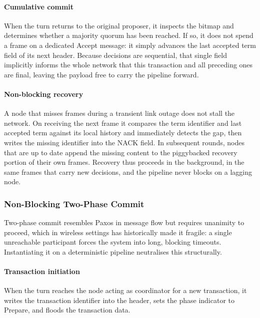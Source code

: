 \documentclass[journal]{IEEEtran}
\begin{document}
\paragraph{Cumulative commit}
When the turn returns to the original proposer, it inspects the bitmap and
determines whether a majority quorum has been reached. If so, it does not
spend a frame on a dedicated Accept message: it simply advances the last
accepted term field of its next header. Because decisions are sequential,
that single field implicitly informs the whole network that this
transaction and all preceding ones are final, leaving the payload free to
carry the pipeline forward.

\paragraph{Non-blocking recovery}
A node that misses frames during a transient link outage does not stall
the network. On receiving the next frame it compares the term identifier
and last accepted term against its local history and immediately detects
the gap, then writes the missing identifier into the NACK field. In
subsequent rounds, nodes that are up to date append the missing content to
the piggybacked recovery portion of their own frames. Recovery thus
proceeds in the background, in the same frames that carry new decisions,
and the pipeline never blocks on a lagging node.

\subsubsection{Non-Blocking Two-Phase Commit}
\label{sec:design-2pc}

Two-phase commit resembles Paxos in message flow but requires unanimity to
proceed, which in wireless settings has historically made it fragile:
a single unreachable participant forces the system into long, blocking
timeouts. Instantiating it on a deterministic pipeline neutralises this
structurally.

\paragraph{Transaction initiation}
When the turn reaches the node acting as coordinator for a new
transaction, it writes the transaction identifier into the header, sets
the phase indicator to Prepare, and floods the transaction data.
\end{document}
